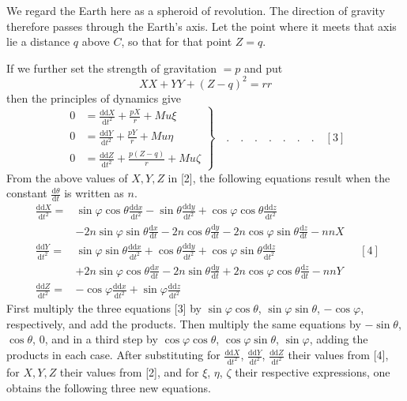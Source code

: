We regard the Earth here as a spheroid of revolution. The direction of gravity therefore passes through the Earth's axis. Let the point where it meets that axis lie a distance $q$ above $C$, so that for that point $Z=q$.

If we further set the strength of gravitation $=p$ and put
\[
XX+YY+(Z-q)^2=rr
\]
then the principles of dynamics give
\[
\left.\begin{aligned}
0&=\frac{\mathrm{dd}X}{\mathrm{d}t^2}+\frac{pX}{r}+Mu\xi\\
0&=\frac{\mathrm{dd}Y}{\mathrm{d}t^2}+\frac{pY}{r}+Mu\eta\\
0&=\frac{\mathrm{dd}Z}{\mathrm{d}t^2}+\frac{p(Z-q)}{r}+Mu\zeta
\end{aligned}\right\}\quad.\quad.\quad.\quad.\quad.\quad.\quad.\quad[3]
\]
From the above values of $X,Y,Z$ in [2], the following equations result when the constant $\tfrac{\mathrm{d}\theta}{\mathrm{d}t}$ is written as $n$.
\[
\begin{aligned}
\frac{\mathrm{dd}X}{\mathrm{d}t^2}={}&\sin\varphi\cos\theta\frac{\mathrm{dd}x}{\mathrm{d}t^2}-\sin\theta\frac{\mathrm{dd}y}{\mathrm{d}t^2}+\cos\varphi\cos\theta\frac{\mathrm{dd}z}{\mathrm{d}t^2}\\
&-2n\sin\varphi\sin\theta\frac{\mathrm{d}x}{\mathrm{d}t}-2n\cos\theta\frac{\mathrm{d}y}{\mathrm{d}t}-2n\cos\varphi\sin\theta\frac{\mathrm{d}z}{\mathrm{d}t}-nnX\\[5pt]
\frac{\mathrm{dd}Y}{\mathrm{d}t^2}={}&\sin\varphi\sin\theta\frac{\mathrm{dd}x}{\mathrm{d}t^2}+\cos\theta\frac{\mathrm{dd}y}{\mathrm{d}t^2}+\cos\varphi\sin\theta\frac{\mathrm{dd}z}{\mathrm{d}t^2}\\
&+2n\sin\varphi\cos\theta\frac{\mathrm{d}x}{\mathrm{d}t}-2n\sin\theta\frac{\mathrm{d}y}{\mathrm{d}t}+2n\cos\varphi\cos\theta\frac{\mathrm{d}z}{\mathrm{d}t}-nnY\\[5pt]
\frac{\mathrm{dd}Z}{\mathrm{d}t^2}={}&-\cos\varphi\frac{\mathrm{dd}x}{\mathrm{d}t^2}+\sin\varphi\frac{\mathrm{dd}z}{\mathrm{d}t^2}
\end{aligned}\quad[4]
\]
First multiply the three equations [3] by $\sin\varphi\cos\theta$, $\sin\varphi\sin\theta$, $-\cos\varphi$, respectively, and add the products. Then multiply the same equations by $-\sin\theta$, $\cos\theta$, $0$, and in a third step by $\cos\varphi\cos\theta$, $\cos\varphi\sin\theta$, $\sin\varphi$, adding the products in each case. After substituting for $\tfrac{\mathrm{dd}X}{\mathrm{d}t^2}$, $\tfrac{\mathrm{dd}Y}{\mathrm{d}t^2}$, $\tfrac{\mathrm{dd}Z}{\mathrm{d}t^2}$ their values from [4], for $X,Y,Z$ their values from [2], and for $\xi$, $\eta$, $\zeta$ their respective expressions, one obtains the following three new equations.
